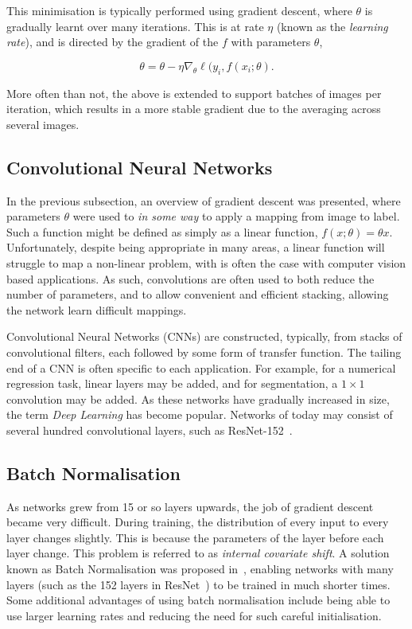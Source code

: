 \noindent This minimisation is typically performed using gradient
descent, where $\theta$ is gradually learnt over many iterations. This
is at rate $\eta$ (known as the \textit{learning rate}), and is
directed by the gradient of the $f$ with parameters $\theta$,

\begin{equation}
  \theta = \theta - \eta \nabla_\theta \ell(y_i, f(x_i ; \theta) .
\end{equation}

More often than not, the above is extended to support batches of
images per iteration, which results in a more stable gradient due to
the averaging across several images.

\subsection{Convolutional Neural Networks}

In the previous subsection, an overview of gradient descent was
presented, where parameters $\theta$ were used to \textit{in some way}
to apply a mapping from image to label. Such a function might be
defined as simply as a linear function, $f(x;\theta) = \theta
x$. Unfortunately, despite being appropriate in many areas, a linear
function will struggle to map a non-linear problem, with is often the
case with computer vision based applications. As such, convolutions
are often used to both reduce the number of parameters, and to allow
convenient and efficient stacking, allowing the network learn
difficult mappings.

Convolutional Neural Networks (CNNs) are constructed, typically, from
stacks of convolutional filters, each followed by some form of
transfer function. The tailing end of a CNN is often specific to each
application. For example, for a numerical regression task, linear
layers may be added, and for segmentation, a $1\times 1$ convolution
may be added. As these networks have gradually increased in size, the
term \textit{Deep Learning} has become popular. Networks of today may
consist of several hundred convolutional layers, such as
ResNet-152~\cite{he2015deep}.

\subsection{Batch Normalisation}

As networks grew from 15 or so layers upwards, the job of gradient
descent became very difficult. During training, the distribution of
every input to every layer changes slightly. This is because the
parameters of the layer before each layer change. This problem is
referred to as \textit{internal covariate shift}. A solution known as
Batch Normalisation was proposed in~\cite{ioffe2015batch}, enabling
networks with many layers (such as the 152 layers in
ResNet~\cite{he2015deep}) to be trained in much shorter times. Some
additional advantages of using batch normalisation include being able
to use larger learning rates and reducing the need for such careful
initialisation.

